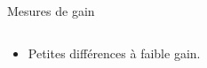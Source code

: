 \begin{frame}{Mesures de gain}
\begin{scriptsize}
\begin{columns}
\begin{column}{0.58\textwidth}
\begin{itemize}
    					\item Petites différences à faible gain.
    				\end{itemize}
    			\end{column}
    		\end{columns}
    	\end{scriptsize}
    \end{frame}

{
	\setlength\pdfpagewidth{12.8cm}%
	\setlength\pdfpageheight{9cm}%
	\begin{frame}[plain]
	\end{frame}
}

